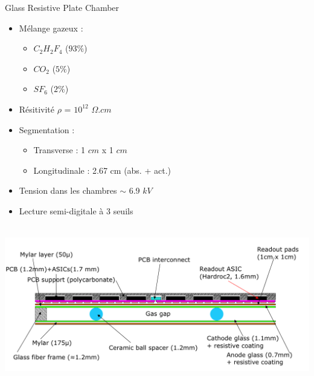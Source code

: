 \documentclass[8pt]{beamer}
\begin{document}
\begin{frame}
\begin{minipage}{0.55\linewidth}
\begin{block}{Glass Resistive Plate Chamber}
      \begin{itemize}
        \item Mélange gazeux :
        \begin{itemize}
          \item $C_2H_2F_4$ ($93\%$)
          \item $CO_2$ ($5\%$)
          \item $SF_6$ ($2\%$)
        \end{itemize}
        \item Résitivité $\rho$ = $10^{12}$ $\Omega.cm$
        \item Segmentation :
        \begin{itemize}
          \item Transverse : 1 $cm$ x 1 $cm$
          \item Longitudinale : 2.67 cm (abs. + act.)
        \end{itemize}
        \item Tension dans les chambres $\sim$ 6.9 $kV$
        \item Lecture semi-digitale à 3 seuils
      \end{itemize}
    \end{block}
    ~ \\
    \centering \includegraphics[width=\linewidth]{figs/GRPC-K7.png}
    ~ \\
    ~ \\
  \end{minipage}
  \end{frame}
\end{document}
